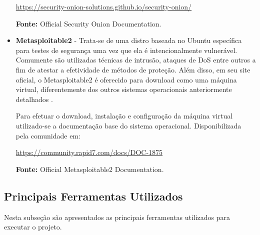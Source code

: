 \begin{itemize}
				\begin{framed}
					\href{https://security-onion-solutions.github.io/security-onion/}{https://security-onion-solutions.github.io/security-onion/}
				\end{framed}
				\textbf{Fonte:} Official Security Onion Documentation.


				\item \textbf{Metasploitable2} - Trata-se de uma distro baseada no Ubuntu específica para testes de segurança uma vez que ela é intencionalmente vulnerável. Comumente são utilizadas técnicas de intrusão, ataques de DoS entre outros a fim de atestar a efetividade de métodos de proteção. Além disso, em seu site oficial, o Metasploitable2 é oferecido para download como uma máquina virtual, diferentemente dos outros sistemas operacionais anteriormente detalhados \cite{metasploitable2}.

				Para efetuar o download, instalação e configuração da máquina virtual utilizado-se a documentação base do sistema operacional. Disponibilizada pela comunidade em:

				\begin{framed}
					\href{https://community.rapid7.com/docs/DOC-1875}{https://community.rapid7.com/docs/DOC-1875}
				\end{framed}
				\textbf{Fonte:} Official Metasploitable2 Documentation.

			\end{itemize}


		\subsection{Principais Ferramentas Utilizados}
		\label{sec:Arquitetura_Componentes_PFU}

			Nesta subseção são apresentados as principais ferramentas utilizados para executar o projeto.


